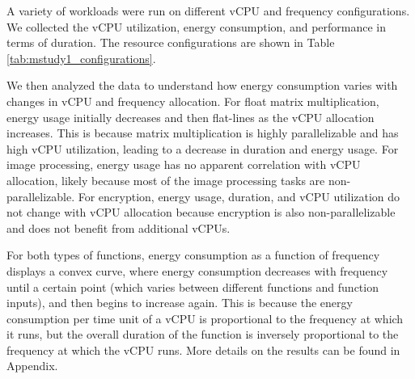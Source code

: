 \documentclass[times, 10pt,twocolumn]{article}
\begin{document}


A variety of workloads were run on different vCPU and frequency configurations. We collected the vCPU utilization, energy consumption, and performance in terms of duration. The resource configurations are shown in Table \ref{tab:mstudy1_configurations}.

We then analyzed the data to understand how energy consumption varies with changes in vCPU and frequency allocation. For float matrix multiplication, energy usage initially decreases and then flat-lines as the vCPU allocation increases. This is because matrix multiplication is highly parallelizable and has high vCPU utilization, leading to a decrease in duration and energy usage. For image processing, energy usage has no apparent correlation with vCPU allocation, likely because most of the image processing tasks are non-parallelizable. For encryption, energy usage, duration, and vCPU utilization do not change with vCPU allocation because encryption is also non-parallelizable and does not benefit from additional vCPUs.

For both types of functions, energy consumption as a function of frequency displays a convex curve, where energy consumption decreases with frequency until a certain point (which varies between different functions and function inputs), and then begins to increase again. This is because the energy consumption per time unit of a vCPU is proportional to the frequency at which it runs, but the overall duration of the function is inversely proportional to the frequency at which the vCPU runs. More details on the results can be found in Appendix.
\end{document}

